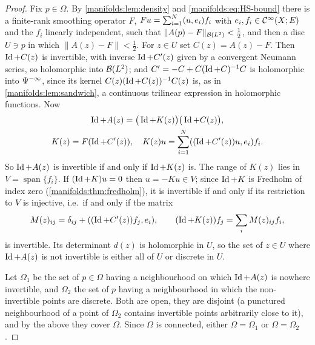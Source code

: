 \begin{proof}
Fix $p\in\Omega$. By \cref{manifolds:lem:density} and \eqref{manifolds:eq:HS-bound}
there is a finite-rank smoothing operator $F$, $Fu=\sum_{i=1}^N( u, e_i)f_i$ with
$e_i,f_i\in\mathcal{C}^\infty(X;E)$ and the $f_i$ linearly independent, such that
$\|A(p)-F\|_{\mathcal{B}(L^2)}<\frac12$, and then a disc $U\ni p$ in which
$\|A(z)-F\|<\frac12$. For $z\in U$ set $C(z)=A(z)-F$. Then $\operatorname{Id}+C(z)$ is invertible, with
inverse $\operatorname{Id}+C'(z)$ given by a convergent Neumann series, so holomorphic into
$\mathcal{B}(L^2)$; and $C'=-C+C(\operatorname{Id}+C)^{-1}C$ is holomorphic into $\Psi^{-\infty}$, since its
kernel $C(z)(\operatorname{Id}+C(z))^{-1}C(z)$ is, as in \cref{manifolds:lem:sandwich}, a
continuous trilinear expression in holomorphic functions. Now
\begin{equation}\label{manifolds:eq:analytic-factor}
\begin{gathered}
\operatorname{Id}+A(z)=\big(\operatorname{Id}+K(z)\big)\big(\operatorname{Id}+C(z)\big),\\
K(z)=F(\operatorname{Id}+C'(z)),\quad
K(z)u=\sum_{i=1}^N( (\operatorname{Id}+C'(z))u, e_i)f_i .
\end{gathered}
\end{equation}
So $\operatorname{Id}+A(z)$ is invertible if and only if $\operatorname{Id}+K(z)$ is. The range of $K(z)$ lies in
$V=\operatorname{span}\{f_i\}$. If $(\operatorname{Id}+K)u=0$ then $u=-Ku\in V$; since $\operatorname{Id}+K$ is
Fredholm of index zero (\cref{manifolds:thm:fredholm}), it is invertible if and only if
its restriction to $V$ is injective, i.e.\ if and only if the matrix
\begin{equation*}
M(z)_{ij}=\delta_{ij}+( (\operatorname{Id}+C'(z))f_j, e_i),\qquad (\operatorname{Id}+K(z))f_j=\sum_iM(z)_{ij}f_i,
\end{equation*}
is invertible. Its determinant $d(z)$ is holomorphic in $U$, so the set of
$z\in U$ where $\operatorname{Id}+A(z)$ is not invertible is either all of $U$ or discrete in $U$.

Let $\Omega_1$ be the set of $p\in\Omega$ having a neighbourhood on which $\operatorname{Id}+A(z)$ is
nowhere invertible, and $\Omega_2$ the set of $p$ having a neighbourhood in which the
non-invertible points are discrete. Both are open, they are disjoint (a punctured
neighbourhood of a point of $\Omega_2$ contains invertible points arbitrarily close to
it), and by the above they cover $\Omega$. Since $\Omega$ is connected, either
$\Omega=\Omega_1$ or $\Omega=\Omega_2$.


\end{proof}
